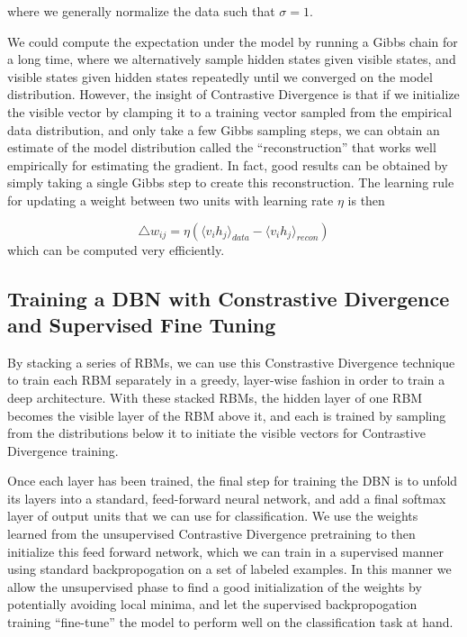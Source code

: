 \documentclass{article}
\begin{document}
where we generally normalize the data such that $\sigma = 1$.

We could compute the expectation under the model by running a Gibbs chain for a
long time, where we alternatively sample hidden states given visible states,
and visible states given hidden states repeatedly until we converged on the
model distribution. However, the insight of Contrastive Divergence is that if
we initialize the visible vector by clamping it to a training vector sampled
from the empirical data distribution, and only take a few Gibbs sampling steps,
we can obtain an estimate of the model distribution called the
``reconstruction'' that works well empirically for estimating the gradient. In
fact, good results can be obtained by simply taking a single Gibbs step to
create this reconstruction. The learning rule for updating a weight between two
units with learning rate $\eta$ is then

\[
  \triangle w_{ij} = \eta( 
  \langle v_i h_j \rangle_{data} - \langle v_i h_j \rangle_{recon}
  )
\]
which can be computed very efficiently.

\subsection{Training a DBN with Constrastive Divergence and Supervised Fine Tuning}

By stacking a series of RBMs, we can use this Constrastive Divergence technique
to train each RBM separately in a greedy, layer-wise fashion in order to train
a deep architecture. With these stacked RBMs, the hidden layer of one RBM
becomes the visible layer of the RBM above it, and each is trained by sampling
from the distributions below it to initiate the visible vectors for
Contrastive Divergence training.

Once each layer has been trained, the final step for training the DBN is to
unfold its layers into a standard, feed-forward neural network, and add a final
softmax layer of output units that we can use for classification. We use the
weights learned from the unsupervised Contrastive Divergence pretraining to
then initialize this feed forward network, which we can train in a supervised
manner using standard backpropogation on a set of labeled examples. In this
manner we allow the unsupervised phase to find a good initialization of the
weights by potentially avoiding local minima, and let the supervised
backpropogation training ``fine-tune'' the model to perform well on the
classification task at hand.
\end{document}
